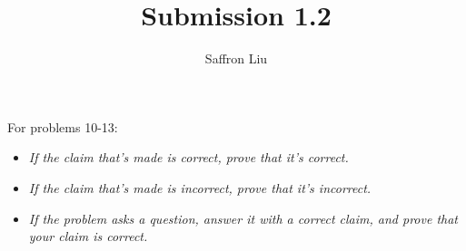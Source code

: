 \documentclass{article}
\title{Submission 1.2}
\author{Saffron Liu}
\date{}
\begin{document}
\maketitle

\begin{flushleft}
    For problems 10-13:
\end{flushleft}
\begin{itemize}
    \item \textit{If the claim that’s made is correct, prove that it’s correct.}
    \item \textit{If the claim that’s made is incorrect, prove that it’s incorrect.}
    \item \textit{If the problem asks a question, answer it with a correct claim, and prove that your claim is correct.}
\end{itemize}
\end{document}
